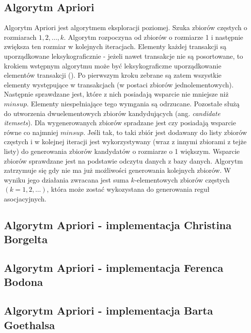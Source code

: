 \subsection{Algorytm Apriori \cite{Agrawal}}
\label{c321}
Algorytm Apriori jest algorytmem eksploracji poziomej. Szuka zbiorów częstych o rozmiarach \(1, 2,\dots , k\). Algorytm rozpoczyna od zbiorów o rozmiarze 1 i następnie zwiększa ten rozmiar w kolejnych iteracjach. Elementy każdej transakcji są uporządkowane leksykograficznie - jeżeli nawet transakcje nie są posortowane, to krokiem wstępnym algorytmu może być leksykograficzne uporządkowanie elementów transakcji (\cite{Morzy}). Po pierwszym kroku zebrane są zatem wszystkie elementy występujące w transakcjach (w postaci zbiorów jednolementowych). Następnie sprawdzane jest, które z nich posiadają wsparcie nie mniejsze niż \(minsup\). Elementy niespełniające tego wymgania są odrzucane. Pozostałe służą do utworzenia dwuelementowych zbiorów kandydujących (ang. \textit{candidate itemsets}). Dla wygenerowanych zbiorów spradzane jest czy posiadają wsparcie równe co najmniej \(minsup\). Jeśli tak, to taki zbiór jest dodawany do listy zbiorów częstych i w kolejnej iteracji jest wykorzystywany (wraz z innymi zbiorami z tejże listy) do generowania zbiorów kandydatów o rozmiarze o 1 większym. Wsparcie zbiorów sprawdzane jest na podstawie odczytu danych z bazy danych. Algorytm zatrzymuje się gdy nie ma już możliwości generowania kolejnych zbiorów. W wyniku jego działania zwracana jest suma \(k\)-elementowych zbiorów częstych \((k = 1, 2,\dots)\), która może zostać wykozystana do generowania reguł asocjacyjnych.

\subsection{Algorytm Apriori - implementacja Christina Borgelta \cite{Borgelt}}
\label{c322}

\subsection{Algorytm Apriori - implementacja Ferenca Bodona \cite{Bodon}}
\label{c323}

\subsection{Algorytm Apriori - implementacja Barta Goethalsa \cite{Goethals}}
\label{c324}



